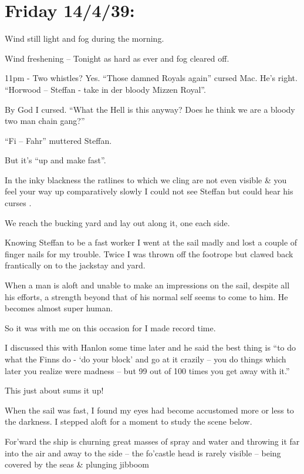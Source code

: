 \documentclass[
  11pt,
  msmallroyalvopaper
]{memoir}
\begin{document}
\hypertarget{friday-14439}{%
\section{Friday 14/4/39:}\label{friday-14439}}

Wind still light and fog during the morning.

Wind freshening -- Tonight as hard as ever and fog cleared off.

11pm - Two whistles? Yes. ``Those damned Royals again'' cursed Mac. He's
right. ``Horwood -- Steffan - take in der bloody Mizzen Royal''.

By God I cursed. ``What the Hell is this anyway? Does he think we are a
bloody two man chain gang?''

``Fi -- Fahr'' muttered Steffan.

But it's ``up and make fast''.

In the inky blackness the ratlines to which we cling are not even
visible \& you feel your way up comparatively slowly I could not see
Steffan but could hear his curses .

We reach the bucking yard and lay out along it, one each side.

Knowing Steffan to be a fast worker I went at the sail madly and lost a
couple of finger nails for my trouble. Twice I was thrown off the
footrope but clawed back frantically on to the jackstay and yard.

When a man is aloft and unable to make an impressions on the sail,
despite all his efforts, a strength beyond that of his normal self seems
to come to him. He becomes almost super human.

So it was with me on this occasion for I made record time.

I discussed this with Hanlon some time later and he said the best thing
is ``to do what the Finns do - `do your block' and go at it crazily --
you do things which later you realize were madness -- but 99 out of 100
times you get away with it.''

This just about sums it up!

When the sail was fast, I found my eyes had become accustomed more or
less to the darkness. I stepped aloft for a moment to study the scene
below.

For'ward the ship is churning great masses of spray and water and
throwing it far into the air and away to the side -- the fo'castle head
is rarely visible -- being covered by the seas \& plunging jibboom
\end{document}
